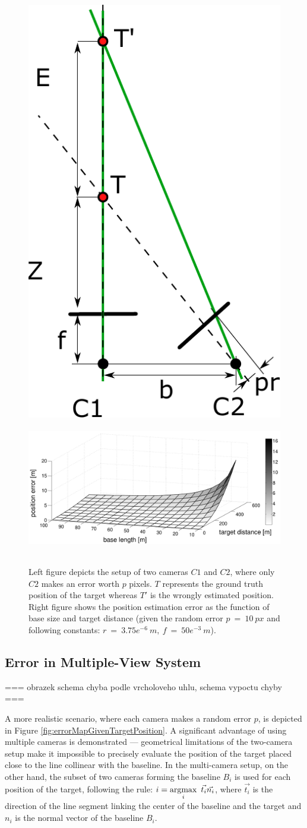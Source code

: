 \begin{figure}[htb]\centering
	\centering
	\includegraphics[width=0.27\linewidth]{fig/error_2units.pdf}
	\includegraphics[width=0.66\linewidth, height=6.0cm]{fig/error_analysis_base_distance.pdf}
	\caption{Left figure depicts the setup of two cameras $C1$ and $C2$, where only $C2$ makes an error worth $p$ pixels. $T$ represents the ground truth position of the target whereas $T'$ is the wrongly estimated position. Right figure shows the position estimation error as the function of base size and target distance (given the random error $p~=~10~px$ and following constants: $r~=~3.75e^{-6}~m,\ f~=~50e^{-3}~m$).}
	\label{fig:errorGivenBaseAndDistance}
\end{figure}

\subsection{Error in Multiple-View System}

=== obrazek schema chyba podle vrcholoveho uhlu, schema vypoctu chyby ===

A more realistic scenario, where each camera makes a random error $p$, is depicted in Figure \ref{fig:errorMapGivenTargetPosition}. A significant advantage of using multiple cameras is demonstrated --- geometrical limitations of the two-camera setup make it impossible to precisely evaluate the position of the target placed close to the line collinear with the baseline. In the multi-camera setup, on the other hand, the subset of two cameras forming the baseline $B_{i}$ is used for each position of the target, following the rule: $i = \argmax_{i}\ \vec{t_{i}}\vec{n_{i}}$, where $\vec{t_{i}}$ is the direction of the line segment linking the center of the baseline and the target and $n_{i}$ is the normal vector of the baseline $B_{i}$.

